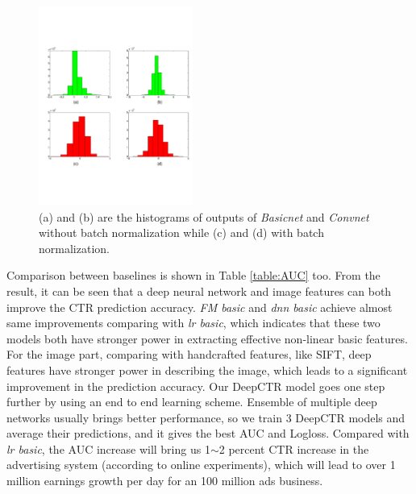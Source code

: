 \documentclass{sig-alternate}
\begin{document}
\begin{figure}
	\centering
	\includegraphics[width=0.45\textwidth]{bn_hist_fix_3}
	\caption{(a) and (b) are the histograms of outputs of \emph{Basicnet} and \emph{Convnet} without batch normalization while (c) and (d) with batch normalization. }
	\label{fig:bn_comb}
\end{figure}

Comparison between baselines is shown in Table \ref{table:AUC} too. From the result, it can be seen that a deep neural network and image features can both improve the CTR prediction accuracy.  \emph{FM basic} and \emph{dnn basic} achieve almost same improvements comparing with \emph{lr basic}, which  indicates that these two models both have stronger  power in extracting effective non-linear basic features.   For the image part, comparing with handcrafted features, like SIFT, deep features have stronger power in describing the image, which leads to a significant improvement in the prediction accuracy. Our DeepCTR model goes one step further by using an end to end learning scheme. Ensemble of multiple deep networks usually brings better performance, so we train 3 DeepCTR models and average their predictions, and it gives the best AUC and Logloss. Compared with \emph{lr basic}, the AUC increase will bring us 1$\sim$2 percent CTR increase in the advertising system (according to online experiments), which will lead to over 1 million earnings growth per day for an 100 million ads business.  
\end{document}
